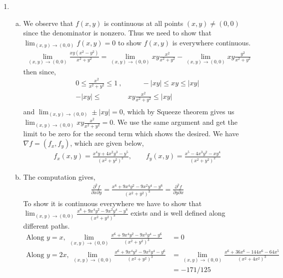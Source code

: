 \documentclass[a4paper,12pt]{article}
\theoremstyle{definition}
\begin{document}
\begin{enumerate}
\item
\begin{enumerate}[(a)]
\item We observe that $f(x,y)$ is continuous at all points $(x,y) \neq (0,0)$ since the denominator is nonzero. Thus we need to show that $\lim_{(x,y) \to (0,0)}f(x,y)=0$ to show $f(x,y)$ is everywhere continuous.
\begin{align*}
\lim_{(x,y) \to (0,0)}\frac{xy(x^2-y^2)}{x^2+y^2} = \lim_{(x,y) \to (0,0)}xy\frac{x^2}{x^2+y^2} - \lim_{(x,y) \to (0,0)}xy\frac{y^2}{x^2+y^2}
\end{align*}
then since,
\begin{align*}
0 \leq \frac{x^2}{x^2+y^2} \leq 1~,&\qquad -|xy| \leq xy \leq |xy|\\
-|xy| \leq &xy\frac{x^2}{x^2+y^2} \leq|xy|\\
\end{align*}
and $\lim_{(x,y) \to (0,0)}\pm|xy|=0$, which by Squeeze theorem gives us $\lim_{(x,y) \to (0,0)}xy\frac{x^2}{x^2+y^2}=0$. We use the same argument and get the limit to be zero for the second term which shows the desired.
We have $\nabla f = (f_x, f_y)$, which are given below,
\begin{align*}
f_x(x,y) = \frac{x^4y+4x^2y^3-y^5}{(x^2+y^2)^2},\qquad f_y(x,y) = \frac{x^5-4x^3y^2-xy^4}{(x^2+y^2)^2}
\end{align*}
\item The computation gives,
\begin{align*}
\frac{\partial^2f}{\partial x \partial y} = \frac{x^6+9x^4y^2-9x^2y^4-y^6}{(x^2+y^2)^3} = \frac{\partial^2f}{\partial y \partial x}
\end{align*}
To show it is continuous everywhere we have to show that $\lim_{(x,y)\to(0,0)}\frac{x^6+9x^4y^2-9x^2y^4-y^6}{(x^2+y^2)^3}$ exists and is well defined along different paths.
\begin{align*}
\text{Along $y=x$, }\lim_{(x,y)\to(0,0)}\frac{x^6+9x^4y^2-9x^2y^4-y^6}{(x^2+y^2)^3} &= 0\\
\text{Along $y=2x$, } \lim_{(x,y)\to(0,0)}\frac{x^6+9x^4y^2-9x^2y^4-y^6}{(x^2+y^2)^3}&= \lim_{(x,y)\to(0,0)}\frac{x^6+36x^6-144x^6-64x^5}{(x^2+4x^2)^3} \\
&=-171/125
\end{align*}
\end{enumerate}


\end{enumerate}
\end{document}
